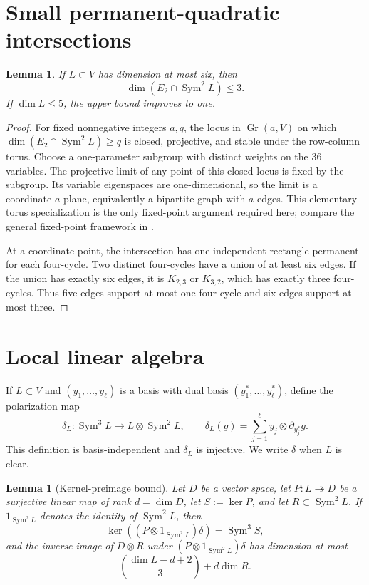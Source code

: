 \documentclass[11pt]{amsart}
\newcommand{\Sym}{\operatorname{Sym}}
\newtheorem{lemma}[theorem]{Lemma}
\theoremstyle{definition}
\begin{document}
\section{Small permanent-quadratic intersections}

\begin{lemma}\label{lem:small-intersection}
If \(L\subset V\) has dimension at most six, then
\[
 \dim(E_2\cap\Sym^2L)\le3.
\]
If \(\dim L\le5\), the upper bound improves to one.
\end{lemma}

\begin{proof}
For fixed nonnegative integers \(a,q\), the locus in
\(\operatorname{Gr}(a,V)\) on which
\(\dim(E_2\cap\Sym^2L)\ge q\) is closed, projective, and stable under the
row-column torus. Choose a one-parameter subgroup with distinct weights on
the 36 variables. The projective limit of any point of this closed locus
is fixed by the subgroup. Its variable eigenspaces are one-dimensional,
so the limit is a coordinate \(a\)-plane, equivalently a bipartite graph
with \(a\) edges. This elementary torus specialization is the only
fixed-point argument required here; compare the general fixed-point
framework in \cite{Borel1991}.

At a coordinate point, the intersection has one independent rectangle
permanent for each four-cycle. Two distinct four-cycles have a union of at
least six edges. If the union has exactly six edges, it is \(K_{2,3}\) or
\(K_{3,2}\), which has exactly three four-cycles. Thus five edges support at
most one four-cycle and six edges support at most three.
\end{proof}

\section{Local linear algebra}\label{sec:local-linear-algebra}

If \(L\subset V\) and \((y_1,\ldots,y_\ell)\) is a basis with dual basis
\((y_1^*,\ldots,y_\ell^*)\), define the polarization map
\[
 \delta_L:\Sym^3L\longrightarrow L\otimes\Sym^2L,
 \qquad \delta_L(g)=\sum_{j=1}^{\ell}y_j\otimes\partial_{y_j^*}g.
\]
This definition is basis-independent and \(\delta_L\) is injective. We write
\(\delta\) when \(L\) is clear.

\begin{lemma}[Kernel-preimage bound]\label{lem:kernel-preimage}
Let \(D\) be a vector space, let \(P:L\twoheadrightarrow D\) be a surjective
linear map of rank \(d=\dim D\), let \(S:=\ker P\), and let
\(R\subset\Sym^2L\). If \(1_{\Sym^2L}\) denotes the identity of
\(\Sym^2L\), then
\[
 \ker((P\otimes1_{\Sym^2L})\delta)=\Sym^3S,
\]
and the inverse image of \(D\otimes R\) under
\((P\otimes1_{\Sym^2L})\delta\) has dimension at most
\[
 \boxed{\binom{\dim L-d+2}{3}+d\dim R.} \tag{4.1}
\]
\end{lemma}
\end{document}
